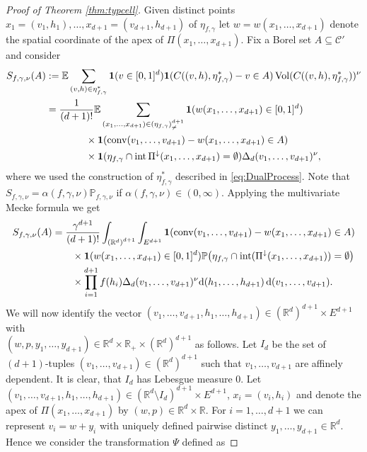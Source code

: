 \documentclass[11pt,a4paper]{article}
\theoremstyle{plain}
\theoremstyle{definition}
\theoremstyle{remark}
\def\EE{\mathbb{E}}
\def\PP{\mathbb{P}}
\def\RR{\mathbb{R}}
\def\cC{\mathcal{C}}
\newcommand{\dd}{{\rm d}}
\newcommand{\conv}{\mathop{\mathrm{conv}}\nolimits}
\newcommand{\inter}{\operatorname{int}}
\newcommand{\Vol}{\operatorname{Vol}}
\begin{document}
    \begin{proof}[Proof of Theorem \ref{thm:typcell}]
    Given distinct points $x_1=(v_1,h_1),\dots,x_{d+1}=(v_{d+1},h_{d+1})$ of $\eta_{f,\gamma}$ let $w=w(x_1,\ldots,x_{d+1})$ denote the spatial coordinate of the apex of $\Pi(x_1,\dots,x_{d+1})$. Fix a Borel set $A\subseteq \cC'$ and consider
    \begin{align*}
        S_{f,\gamma,\nu}(A)&:=\EE \sum_{(v,h)\in \eta^*_{f,\gamma}} {\bf 1}(v\in[0,1]^d){\bf 1}(C((v,h),\eta^*_{f,\gamma})-v\in A)\Vol(C((v,h),\eta^*_{f,\gamma}))^\nu\\
        &={1\over (d+1)!}\EE \sum_{(x_1,\ldots,x_{d+1})\in (\eta_{f,\gamma})_{\neq}^{d+1}}{\bf 1}(w(x_1,\dots,x_{d+1})\in [0,1]^d)\\
        &\qquad\qquad\times {\bf 1}(\conv(v_1,\dots,v_{d+1})-w(x_1,\dots,x_{d+1})\in A)\\
        &\qquad\qquad\times {\bf 1}(\eta_{f,\gamma}\cap \inter\Pi^{\downarrow}(x_1,\ldots,x_{d+1})=\emptyset)\Delta_{d}(v_1,\dots,v_{d+1})^{\nu},
    \end{align*}
    where we used the construction of $\eta^*_{f,\gamma}$ described in \eqref{eq:DualProcess}.
    Note that $S_{f,\gamma,\nu}=\alpha(f,\gamma,\nu) \PP_{f,\gamma,\nu}$ if $\alpha(f,\gamma,\nu) \in(0,\infty)$. Applying the multivariate Mecke formula \cite[Corollary 3.2.3]{SW} we get
    \begin{equation}
        \begin{aligned}\label{eq:S_f}
        S_{f,\gamma,\nu}(A)&=\frac{\gamma^{d+1}}{(d+1)!}\int_{{(\RR^{d})}^{d+1}} \int_{E^{d+1}} {\bf 1}(\conv(v_1,\dots,v_{d+1})-w(x_1,\dots,x_{d+1})\in A)\\
        &\qquad\times {\bf 1}(w(x_1,\dots,x_{d+1})\in [0,1]^{d})\PP\big(\eta_{f,\gamma}\cap\inter (\Pi^{\downarrow}(x_1,\dots,x_{d+1}))=\emptyset\big)\\
        &\qquad\times \prod_{i=1}^{d+1} f(h_i) \Delta_{d}(v_1,\dots,v_{d+1})^{\nu}\dd(h_1,\dots,h_{d+1})\,\dd(v_1,\dots,v_{d+1}).      
        \end{aligned}
    \end{equation}
    We will now identify the vector $(v_1,\dots,v_{d+1},h_1,\dots,h_{d+1}) \in (\RR^{d})^{d+1} \times E^{d+1}$ with \\$(w,p,y_1,\dots,y_{d+1}) \in \RR^{d} \times \RR_+ \times (\RR^{d})^{d+1}$ as follows. Let $I_{d}$ be the set of $(d+1)$-tuples $(v_1,\ldots, v_{d+1})\in (\RR^{d})^{d+1}$ such that $v_1,\dots,v_{d+1}$ are affinely dependent. It is clear, that $I_d$ has Lebesgue measure $0$. Let $(v_1,\dots,v_{d+1},h_1,\dots,h_{d+1}) \in (\RR^{d}\setminus I_d)^{d+1} \times E^{d+1}$, $x_i=(v_i,h_i)$ and denote the apex of $\Pi(x_1,\dots,x_{d+1})$ by $(w,p) \in \RR^{d} \times \RR$. For $i=1,\dots,d+1$ we can represent $v_i=w+y_i$ with uniquely defined pairwise distinct $y_1,\dots,y_{d+1} \in \RR^{d}$. Hence we consider the transformation $\Psi$ defined as

\end{proof}
\end{document}
